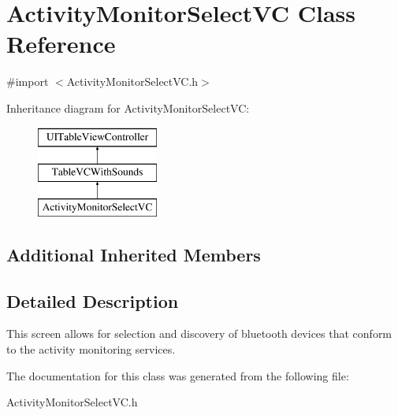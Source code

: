 \hypertarget{interface_activity_monitor_select_v_c}{\section{Activity\-Monitor\-Select\-V\-C Class Reference}
\label{interface_activity_monitor_select_v_c}
}


{\ttfamily \#import $<$Activity\-Monitor\-Select\-V\-C.\-h$>$}

Inheritance diagram for Activity\-Monitor\-Select\-V\-C\-:\begin{figure}[H]
\begin{center}
\leavevmode
\includegraphics[height=3.000000cm]{interface_activity_monitor_select_v_c}
\end{center}
\end{figure}
\subsection*{Additional Inherited Members}


\subsection{Detailed Description}
This screen allows for selection and discovery of bluetooth devices that conform to the activity monitoring services. 

The documentation for this class was generated from the following file\-:\begin{DoxyCompactItemize}
\item 
Activity\-Monitor\-Select\-V\-C.\-h\end{DoxyCompactItemize}
